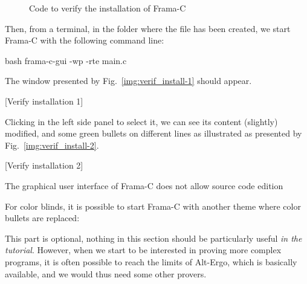 \begin{figure}[!h]
  \caption{Code to verify the installation of Frama-C}
  \label{code:program-proof-frama-c-verify}
\end{figure}



Then, from a terminal, in the folder where the file has been created, we
start Frama-C with the following command line:



\begin{CodeBlock}{bash}
frama-c-gui -wp -rte main.c
\end{CodeBlock}



The window presented by Fig.~\ref{img:verif_install-1} should appear.



[Verify installation 1]


Clicking  in the left side panel to select it, we can see
its content (slightly) modified, and some green bullets on different
lines as illustrated as presented by Fig.~\ref{img:verif_install-2}.



[Verify installation 2]




\begin{Warning}
  The graphical user interface of Frama-C does not allow source code edition
\end{Warning}


\begin{Information}
  For color blinds, it is possible to start Frama-C with another theme where
  color bullets are replaced:
  
\end{Information}




This part is optional, nothing in this section should be particularly
useful \emph{in the tutorial}. However, when we start to be interested
in proving more complex programs, it is often possible to reach the
limits of Alt-Ergo, which is basically available, and we would thus need
some other provers.





